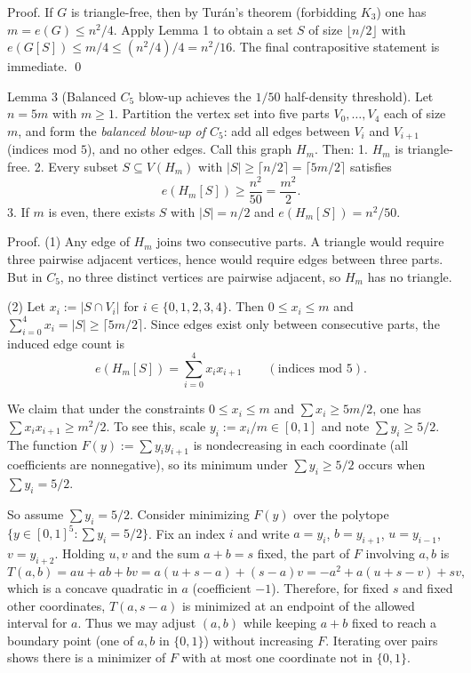 Proof.
If $G$ is triangle-free, then by Tur\'an's theorem (forbidding $K_3$) one has $m=e(G)\le n^2/4$.
Apply Lemma 1 to obtain a set $S$ of size $\lfloor n/2\rfloor$ with $e(G[S])\le m/4 \le (n^2/4)/4=n^2/16$.
The final contrapositive statement is immediate. \qed

Lemma 3 (Balanced $C_5$ blow-up achieves the $1/50$ half-density threshold).
Let $n=5m$ with $m\ge 1$.
Partition the vertex set into five parts $V_0,\dots,V_4$ each of size $m$, and form the \emph{balanced blow-up of $C_5$}:
add all edges between $V_i$ and $V_{i+1}$ (indices mod $5$), and no other edges.
Call this graph $H_{m}$.
Then:
1. $H_m$ is triangle-free.
2. Every subset $S\subseteq V(H_m)$ with $|S|\ge \lceil n/2\rceil=\lceil 5m/2\rceil$ satisfies
\[e(H_m[S])\ge \frac{n^2}{50}=\frac{m^2}{2}.\]
3. If $m$ is even, there exists $S$ with $|S|=n/2$ and $e(H_m[S])=n^2/50$.

Proof.
(1) Any edge of $H_m$ joins two consecutive parts. A triangle would require three pairwise adjacent vertices, hence would require edges between three parts.
But in $C_5$, no three distinct vertices are pairwise adjacent, so $H_m$ has no triangle.

(2) Let $x_i:=|S\cap V_i|$ for $i\in\{0,1,2,3,4\}$.
Then $0\le x_i\le m$ and $\sum_{i=0}^4 x_i = |S|\ge \lceil 5m/2\rceil$.
Since edges exist only between consecutive parts, the induced edge count is
\[e(H_m[S]) = \sum_{i=0}^4 x_i x_{i+1}\qquad(\text{indices mod }5).\tag{*}\]

We claim that under the constraints $0\le x_i\le m$ and $\sum x_i\ge 5m/2$, one has $\sum x_i x_{i+1}\ge m^2/2$.
To see this, scale $y_i:=x_i/m\in[0,1]$ and note $\sum y_i\ge 5/2$.
The function $F(y):=\sum y_i y_{i+1}$ is nondecreasing in each coordinate (all coefficients are nonnegative), so its minimum under $\sum y_i\ge 5/2$ occurs when $\sum y_i=5/2$.

So assume $\sum y_i=5/2$.
Consider minimizing $F(y)$ over the polytope $\{y\in[0,1]^5:\sum y_i=5/2\}$.
Fix an index $i$ and write $a=y_i$, $b=y_{i+1}$, $u=y_{i-1}$, $v=y_{i+2}$.
Holding $u,v$ and the sum $a+b=s$ fixed, the part of $F$ involving $a,b$ is
\[T(a,b)=au+ab+bv = a(u+s-a) + (s-a)v = -a^2 + a(u+s-v) + sv,\]
which is a concave quadratic in $a$ (coefficient $-1$).
Therefore, for fixed $s$ and fixed other coordinates, $T(a,s-a)$ is minimized at an endpoint of the allowed interval for $a$.
Thus we may adjust $(a,b)$ while keeping $a+b$ fixed to reach a boundary point (one of $a,b$ in $\{0,1\}$) without increasing $F$.
Iterating over pairs shows there is a minimizer of $F$ with at most one coordinate not in $\{0,1\}$.

